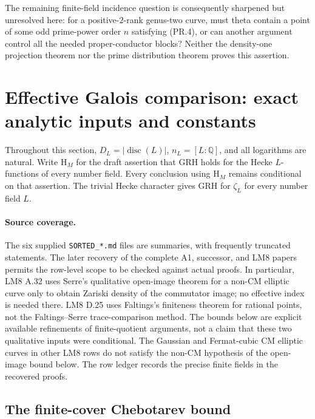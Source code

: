 \documentclass[11pt,a4paper]{article}
\begin{document}
The remaining finite-field incidence question is consequently
sharpened but unresolved here: for a positive-$2$-rank genus-two
curve, must theta contain a point of some odd prime-power order
$n$ satisfying (PR.4), or can another argument control all the
needed proper-conductor blocks? Neither the density-one projection
theorem nor the prime distribution theorem proves this assertion.


\section{Effective Galois comparison: exact analytic inputs and constants}
\label{sec:effective-galois}

Throughout this section, $D_L=|\operatorname{disc}(L)|$, $n_L=[L:\mathbb Q]$, and all logarithms are natural.  Write $\mathrm{H}_M$ for the draft assertion that GRH holds for the Hecke $L$-functions of every number field.  Every conclusion using $\mathrm{H}_M$ remains conditional on that assertion.  The trivial Hecke character gives GRH for $\zeta_L$ for every number field $L$.

\paragraph{Source coverage.}
The six supplied \texttt{SORTED\_*.md} files are summaries, with frequently truncated statements.  The later recovery of the complete A1, successor, and LM8 papers permits the row-level scope to be checked against actual proofs.  In particular, LM8 A.32 uses Serre's qualitative open-image theorem for a non-CM elliptic curve only to obtain Zariski density of the commutator image; no effective index is needed there.  LM8 D.25 uses Faltings's finiteness theorem for rational points, not the Faltings--Serre trace-comparison method.  The bounds below are explicit available refinements of finite-quotient arguments, not a claim that these two qualitative inputs were conditional.  The Gaussian and Fermat-cubic CM elliptic curves in other LM8 rows do not satisfy the non-CM hypothesis of the open-image bound below.  The row ledger records the precise finite fields in the recovered proofs.

\subsection{The finite-cover Chebotarev bound}
\end{document}
